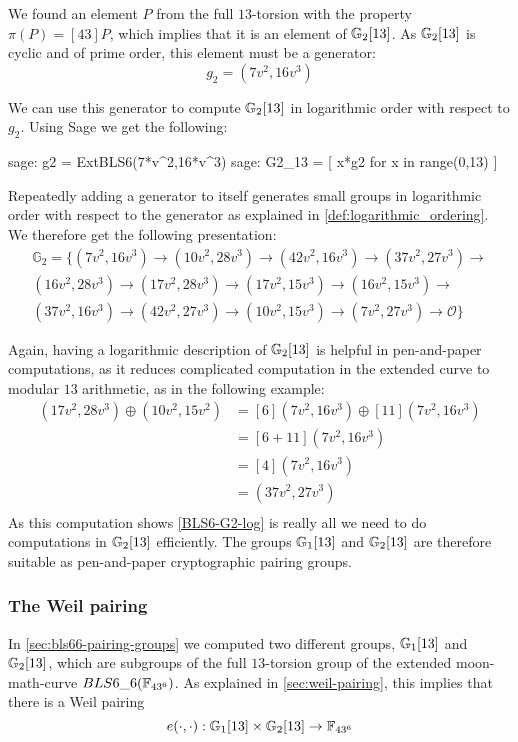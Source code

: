 We found an element $P$ from the full $13$-torsion with the property $\pi(P) = [43]P$, which implies that it is an element of $\mathbb{G}_2[13]$. As $\mathbb{G}_2[13]$ is cyclic and of prime order, this element must be a generator:
\begin{equation}
g_{2} = (7v^2, 16v^3)
\end{equation}

We can use this generator to compute $\mathbb{G}_2[13]$ in logarithmic order with respect to $g_{2}$. Using Sage we get the following:
\begin{sagecommandline}
sage: g2 = ExtBLS6(7*v^2,16*v^3)
sage: G2_13 = [ x*g2 for x in range(0,13) ]
\end{sagecommandline}
Repeatedly adding a generator to itself generates small groups in logarithmic order with respect to the generator as explained in \ref{def:logarithmic_ordering}. We therefore get the following presentation:
\begin{multline}
\label{BLS6-G2-log}
\mathbb{G}_2=\{
(7v^2, 16v^3) \to
(10v^2, 28v^3)\to
(42v^2, 16v^3)\to
(37v^2, 27v^3)\to\\
(16v^2, 28v^3)\to
(17v^2, 28v^3)\to
(17v^2, 15v^3)\to
(16v^2, 15v^3)\to\\
(37v^2, 16v^3)\to
(42v^2, 27v^3)\to
(10v^2, 15v^3)\to
(7v^2, 27v^3)\to
\mathcal{O}\}
\end{multline}

Again, having a logarithmic description of $\mathbb{G}_2[13]$ is helpful in pen-and-paper computations, as it reduces complicated computation in the extended curve to modular $13$ arithmetic, as in the following example:
\begin{align*}
(17v^2,28v^3)\oplus (10v^2,15v^2)  & = [6](7v^2,16v^3)\oplus [11](7v^2,16v^3)\\
                      & = [6+11](7v^2,16v^3)\\
                      & = [4](7v^2,16v^3)\\
                      & = (37v^2,27v^3)\\
\end{align*}
As this computation shows \ref{BLS6-G2-log} is really all we need to do computations in $\mathbb{G}_2[13]$ efficiently. The groups $\mathbb{G}_1[13]$ and $\mathbb{G}_2[13]$ are therefore suitable as pen-and-paper cryptographic pairing groups. 

\subsubsection{The Weil pairing}
In \ref{sec:bls66-pairing-groups} we computed two different groups, $\mathbb{G}_1[13]$ and $\mathbb{G}_2[13]$, which are subgroups of the full $13$-torsion group of the extended moon-math-curve $BLS6\_6(\mathbb{F}_{43^6})$. As explained in \ref{sec:weil-pairing}, this implies that there is a Weil pairing 
\begin{equation}
e(\cdot,\cdot): \mathbb{G}_1[13]\times\mathbb{G}_2[13] \to \mathbb{F}_{43^6}
\end{equation}

